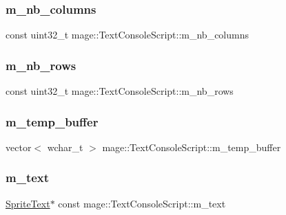 \subsubsection{\texorpdfstring{m\+\_\+nb\+\_\+columns}{m\_nb\_columns}}
{\footnotesize\ttfamily const uint32\+\_\+t mage\+::\+Text\+Console\+Script\+::m\+\_\+nb\+\_\+columns\hspace{0.3cm}{\ttfamily [private]}}

\hypertarget{classmage_1_1_text_console_script_ac2e2d9630355f22945259d5a0af135ef}{}\label{classmage_1_1_text_console_script_ac2e2d9630355f22945259d5a0af135ef} 
\subsubsection{\texorpdfstring{m\+\_\+nb\+\_\+rows}{m\_nb\_rows}}
{\footnotesize\ttfamily const uint32\+\_\+t mage\+::\+Text\+Console\+Script\+::m\+\_\+nb\+\_\+rows\hspace{0.3cm}{\ttfamily [private]}}

\hypertarget{classmage_1_1_text_console_script_a6500bfd006f5c90d05f3da7f3e8e75a8}{}\label{classmage_1_1_text_console_script_a6500bfd006f5c90d05f3da7f3e8e75a8} 
\subsubsection{\texorpdfstring{m\+\_\+temp\+\_\+buffer}{m\_temp\_buffer}}
{\footnotesize\ttfamily vector$<$ wchar\+\_\+t $>$ mage\+::\+Text\+Console\+Script\+::m\+\_\+temp\+\_\+buffer\hspace{0.3cm}{\ttfamily [private]}}

\hypertarget{classmage_1_1_text_console_script_a43ef712ae52d2776edba574d32f759bc}{}\label{classmage_1_1_text_console_script_a43ef712ae52d2776edba574d32f759bc} 
\subsubsection{\texorpdfstring{m\+\_\+text}{m\_text}}
{\footnotesize\ttfamily \hyperlink{classmage_1_1_sprite_text}{Sprite\+Text}$\ast$ const mage\+::\+Text\+Console\+Script\+::m\+\_\+text\hspace{0.3cm}{\ttfamily [private]}}

